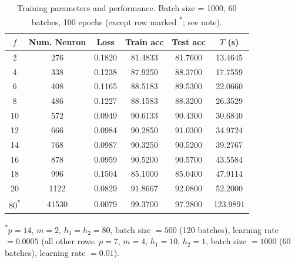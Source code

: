 \begin{table}[htbp]
\centering
\caption{Training parameters and performance. Batch size = 1000, 60 batches, 100 epochs (except row marked \textsuperscript{*}; see note).}
\label{tab:training_parameters_performance}
\begin{tabular}{cccccc}
\toprule
$f$ & Num. Neuron & Loss    & Train acc & Test acc & $T$ (s) \\
\midrule
2      & 276  & 0.1820 & 81.4833 &81.7600 & 13.4645  \\
4      & 338  & 0.1238 & 87.9250 &88.3700 & 17.7559  \\
6      & 408  & 0.1165 & 88.5183 &89.5300 & 22.0660  \\
8      & 486  & 0.1227 & 88.1583 &88.3200 & 26.3529  \\
10      & 572  & 0.0949 & 90.6133 &90.4300 & 30.6840  \\
12      & 666  & 0.0984 & 90.2850 &91.0300 & 34.9724  \\
14      & 768  & 0.0987 & 90.3250 &90.5200 & 39.2767  \\
16      & 878  & 0.0959 & 90.5200 &90.5700 & 43.5584  \\
18      & 996  & 0.1504 & 85.1000 &85.0400 & 47.9114  \\
20      & 1122  & 0.0829 & 91.8667 &92.0800 & 52.2000  \\
80\textsuperscript{*}      & 41530  & 0.0079 & 99.3700 &97.2800 & 123.9891  \\
\bottomrule
\end{tabular}%

\vspace{2pt}
{\footnotesize\textsuperscript{*}$p=14$, $m=2$, $h_1{=}h_2{=}80$, batch size $=500$ (120 batches), learning rate $=0.0005$ (all other rows: $p=7$, $m=4$, $h_1{=}10$, $h_2{=}1$, batch size $=1000$ (60 batches), learning rate $=0.01$).}
\end{table}
